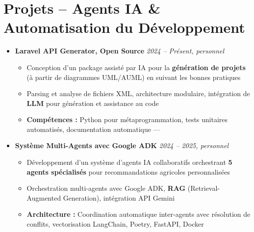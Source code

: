 \documentclass[a4paper,11pt]{article}
\begin{document}
\section{Projets – Agents IA \& Automatisation du Développement}
\begin{itemize}[leftmargin=*, label={}]

    \item \textbf{Laravel API Generator, Open Source} \hfill \textit{2024 -- Présent, personnel}
    \vspace{-2pt}
    \begin{itemize}[leftmargin=0.4cm, nosep, label=\tiny$\bullet$]
        \item \small{Conception d'un package assisté par IA pour la \textbf{génération de projets} (à partir de diagrammes UML/AUML) en suivant les bonnes pratiques}
        \item \small{Parsing et analyse de fichiers XML, architecture modulaire, intégration de \textbf{LLM} pour génération et assistance au code}
        \item \small{\textbf{Compétences :} Python pour métaprogrammation, tests unitaires automatisés, documentation automatique — \href{https://github.com/Nameless0l}{\faGithub}}
    \end{itemize}
    \vspace{4pt}

    \item \textbf{Système Multi-Agents avec Google ADK} \hfill \textit{2024 -- 2025, personnel}
    \vspace{-2pt}
    \begin{itemize}[leftmargin=0.4cm, nosep, label=\tiny$\bullet$]
        \item \small{Développement d'un système d'agents IA collaboratifs orchestrant \textbf{5 agents spécialisés} pour recommandations agricoles personnalisées}
        \item \small{Orchestration multi-agents avec Google ADK, \textbf{RAG} (Retrieval-Augmented Generation), intégration API Gemini}
        \item \small{\textbf{Architecture :} Coordination automatique inter-agents avec résolution de conflits, vectorisation LangChain, Poetry, FastAPI, Docker}
    \end{itemize}
\end{itemize}

\end{document}
